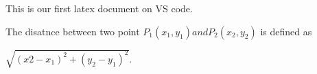 \documentclass[11pt]{article}
\begin{document}
This is our first latex document on VS code.

The disatnce between two point $P_1(x_1,y_1) and P_2(x_2,y_2)$ is defined as

$\sqrt{(x2-x_1)^2 + (y_2-y_1)^2}$.
\end{document}
